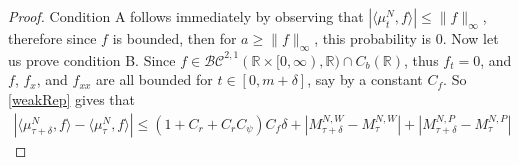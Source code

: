\documentclass{article}
\newcommand{\B}[1]{\mathbb{#1}}
\newcommand{\C}[1]{\mathcal{#1}}
\begin{document}
\begin{proof}
    Condition A follows immediately by observing that $|\langle \mu_t^N, f\rangle| \leq \|f\|_\infty$, therefore since $f$ is bounded, then for $a\geq \|f\|_\infty$, this probability is $0$. Now let us prove condition B. Since $f\in \C{BC}^{2,1}(\B{R}\times [0,\infty),\B{R})\cap C_b(\B{R})$, thus $f_t=0$, and $f$, $f_x$, and $f_{xx}$ are all bounded for $t\in [0,m+\delta]$, say by a constant $C_{f}$. So \eqref{weakRep} gives that
    \begin{align*}
    |\langle \mu_{\tau+\delta}^N,f\rangle - \langle \mu_\tau^N,f\rangle| %
    \leq  (1+C_r+C_rC_\psi)C_f\delta+|M_{\tau+\delta}^{N,W}-M_{\tau}^{N,W}| + |M_{\tau+\delta}^{N,P}-M_{\tau}^{N,P}|
    \end{align*}


\end{proof}
\end{document}
